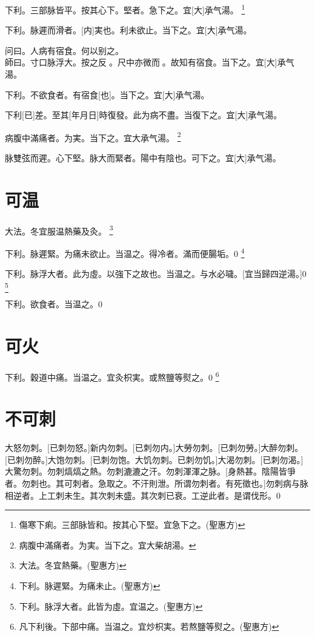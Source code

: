 \documentclass[11pt,oneside,b5paper]{ctexbook}
\begin{document}
\begin{flushleft}
下利。三部脉皆平。按其心下。堅者。急下之。宜[大]承气湯。
\footnote{傷寒下痢。三部脉皆和。按其心下堅。宜急下之。(聖惠方)}

下利。脉遲而滑者。[内]実也。利未欲止。当下之。宜[大]承气湯。

问曰。人病有宿食。何以别之。\\
師曰。寸口脉浮大。按之反{𬈧}。尺中亦微而{𬈧}。故知有宿食。当下之。宜[大]承气湯。

下利。不欲食者。有宿食[也]。当下之。宜[大]承气湯。

下利[已]差。至其[年月日]時復發。此为病不盡。当復下之。宜[大]承气湯。

病腹中滿痛者。为実。当下之。宜大承气湯。
\footnote{病腹中滿痛者。为実。当下之。宜大柴胡湯。}

脉雙弦而遲。心下堅。脉大而緊者。陽中有陰也。可下之。宜[大]承气湯。

\section{可温}

大法。冬宜服温熱藥及灸。
\footnote{大法。冬宜熱藥。(聖惠方)}

下利。脉遲緊。为痛未欲止。当温之。得冷者。滿而便腸垢。0
\footnote{下利。脉遲緊。为痛未止。(聖惠方)}

下利。脉浮大者。此为虛。以強下之故也。当温之。与水必噦。[宜当歸四逆湯。]0
\footnote{下利。脉浮大者。此皆为虛。宜温之。(聖惠方)}

下利。欲食者。当温之。0

\section{可火}

下利。穀道中痛。当温之。宜灸枳実。或熬鹽等熨之。0
\footnote{凡下利後。下部中痛。当温之。宜炒枳実。若熬鹽等熨之。(聖惠方)}

\section{不可刺}

大怒勿刺。[已刺勿怒。]新内勿刺。[已刺勿内。]大勞勿刺。[已刺勿勞。]大醉勿刺。[已刺勿醉。]大饱勿刺。[已刺勿饱。大饥勿刺。已刺勿饥。]大渴勿刺。[已刺勿渴。]大驚勿刺。勿刺熇熇之熱。勿刺漉漉之汗。勿刺渾渾之脉。[身熱甚。陰陽皆爭者。勿刺也。其可刺者。急取之。不汗則泄。所谓勿刺者。有死徵也。]勿刺病与脉相逆者。上工刺未生。其次刺未盛。其次刺已衰。工逆此者。是谓伐形。0


\end{flushleft}
\end{document}

